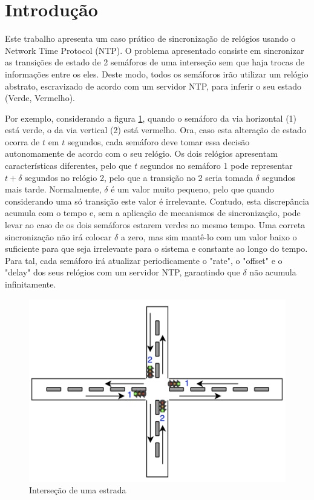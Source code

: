 \section{Introdução}


    Este trabalho apresenta um caso prático de sincronização de relógios usando o Network Time Protocol (NTP). O problema apresentado consiste em sincronizar as transições de estado de 2 semáforos de uma interseção sem que haja trocas de informações entre os eles. Deste modo, todos os semáforos irão utilizar um relógio abstrato, escravizado de acordo com um servidor NTP, para inferir o seu estado (Verde, Vermelho).
    
    Por exemplo, considerando a figura \ref{fig:diagramaEstrada}, quando o semáforo da via horizontal (1) está verde, o da via vertical (2) está vermelho. Ora, caso esta alteração de estado ocorra de $t$ em $t$ segundos, cada semáforo deve tomar essa decisão autonomamente de acordo com o seu relógio.
    Os dois relógios apresentam características diferentes, pelo que $t$ segundos no semáforo 1 pode representar $t + \delta$ segundos no relógio 2, pelo que a transição no 2 seria tomada $\delta$ segundos mais tarde. Normalmente, $\delta$ é um valor muito pequeno, pelo que quando considerando uma só transição este valor é irrelevante. Contudo, esta discrepância acumula com o tempo e, sem a aplicação de mecanismos de sincronização, pode levar ao caso de os dois semáforos estarem verdes ao mesmo tempo.
    Uma correta sincronização não irá colocar $\delta$ a zero, mas sim mantê-lo com um valor baixo o suficiente para que seja irrelevante para o sistema e constante ao longo do tempo. Para tal, cada semáforo irá atualizar periodicamente o "rate", o "offset" e o "delay" dos seus relógios com um servidor NTP, garantindo que $\delta$ não acumula infinitamente.  
    
    \begin{figure}[h]
        \centering
        \includegraphics[width=0.8\linewidth]{figures/diagramaEstrada.png}
        \caption{Interseção de uma estrada}
        \label{fig:diagramaEstrada}
    \end{figure}

